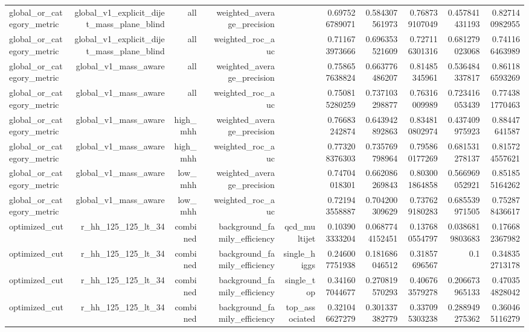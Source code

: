 \begin{table}[htbp]
{\begin{tabular}{lrrrrrrrrrr}
global\_or\_category\_metric & global\_v1\_explicit\_dijet\_mass\_plane\_blind & all &  & weighted\_average\_precision &  & 0.697526789071 & 0.584307561973 & 0.768739107049 & 0.457841431193 & 0.827140982955 \\
global\_or\_category\_metric & global\_v1\_explicit\_dijet\_mass\_plane\_blind & all &  & weighted\_roc\_auc &  & 0.711673973666 & 0.696353521609 & 0.727116301316 & 0.681279023068 & 0.741166463989 \\
global\_or\_category\_metric & global\_v1\_mass\_aware & all &  & weighted\_average\_precision &  & 0.758657638824 & 0.663776486207 & 0.81485345961 & 0.536484337817 & 0.861186593269 \\
global\_or\_category\_metric & global\_v1\_mass\_aware & all &  & weighted\_roc\_auc &  & 0.750815280259 & 0.737103298877 & 0.76316009989 & 0.723416053439 & 0.774381770463 \\
global\_or\_category\_metric & global\_v1\_mass\_aware & high\_mhh &  & weighted\_average\_precision &  & 0.76683242874 & 0.643942892863 & 0.834810802974 & 0.437409975923 & 0.88447641587 \\
global\_or\_category\_metric & global\_v1\_mass\_aware & high\_mhh &  & weighted\_roc\_auc &  & 0.773208376303 & 0.735769798964 & 0.795860177269 & 0.681531278137 & 0.815724557621 \\
global\_or\_category\_metric & global\_v1\_mass\_aware & low\_mhh &  & weighted\_average\_precision &  & 0.74704018301 & 0.662086269843 & 0.803001864858 & 0.566969052921 & 0.851855164262 \\
global\_or\_category\_metric & global\_v1\_mass\_aware & low\_mhh &  & weighted\_roc\_auc &  & 0.721943558887 & 0.704200309629 & 0.737629180283 & 0.685539971505 & 0.752878436617 \\
optimized\_cut & r\_hh\_125\_125\_lt\_34 & combined &  & background\_family\_efficiency & qcd\_multijet & 0.103903333204 & 0.0687744152451 & 0.137680554797 & 0.0386819803683 & 0.176682367982 \\
optimized\_cut & r\_hh\_125\_125\_lt\_34 & combined &  & background\_family\_efficiency & single\_higgs & 0.246007751938 & 0.181686046512 & 0.31857696567 & 0.1 & 0.348352713178 \\
optimized\_cut & r\_hh\_125\_125\_lt\_34 & combined &  & background\_family\_efficiency & single\_top & 0.341607044677 & 0.270819570293 & 0.406763579278 & 0.206673965133 & 0.470354828042 \\
optimized\_cut & r\_hh\_125\_125\_lt\_34 & combined &  & background\_family\_efficiency & top\_associated & 0.321046627279 & 0.301337382779 & 0.337095303238 & 0.288949275362 & 0.360465116279 \\

\end{tabular}}
\end{table}
